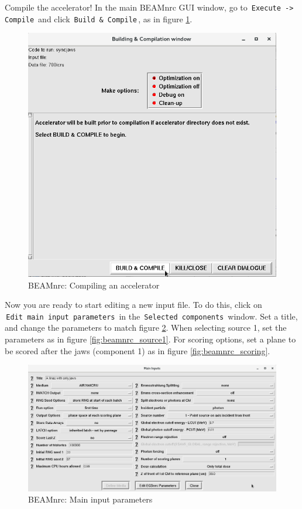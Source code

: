 \documentclass[12pt,twoside]{article}
\begin{document}
Compile the accelerator! In the main BEAMnrc GUI window, go to \,\Verb|Execute -> Compile|\, and click \,\Verb|Build & Compile|\,, as in figure \ref{fig:beamnrc_compile}.

\begin{figure}
\begin{center}
\includegraphics[width=5in]{figures/beamnrc_compile}
\caption{BEAMnrc: Compiling an accelerator}
\label{fig:beamnrc_compile}
\end{center}
\end{figure}

Now you are ready to start editing a new input file. To do this, click on \\
\,\Verb|Edit main input parameters|\, in the \,\Verb|Selected components|\, window. Set a title, and change the parameters to match figure \ref{fig:beamnrc_mainInputs}. When selecting source 1, set the parameters as in figure \ref{fig:beamnrc_source1}. For scoring options, set a plane to be scored after the jaws (component 1) as in figure \ref{fig:beamnrc_scoring}.

\begin{figure}
\begin{center}
\includegraphics[width=6in]{figures/beamnrc_main}
\caption{BEAMnrc: Main input parameters}
\label{fig:beamnrc_mainInputs}
\end{center}
\end{figure}
\end{document}
